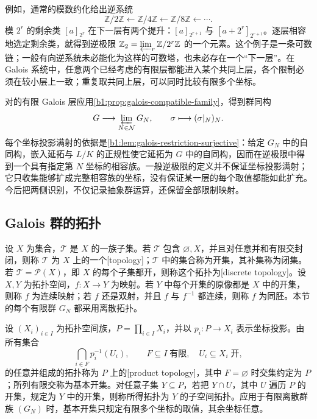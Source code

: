 \ProseParagraphBreak
例如，通常的模数约化给出逆系统
\[
	\mathbb Z/2\mathbb Z\longleftarrow \mathbb Z/4\mathbb Z\longleftarrow \mathbb Z/8\mathbb Z\longleftarrow\cdots.
\]
模 \(2^r\) 的剩余类 \([a]_{2^r}\) 在下一层有两个提升：\([a]_{2^{r+1}}\) 与 \([a+2^r]_{2^{r+1}}\)。逐层相容地选定剩余类，就得到逆极限 \(\mathbb Z_2=\varprojlim_r\mathbb Z/2^r\mathbb Z\) 的一个元素。这个例子是一条可数链；一般有向逆系统未必能化为这样的可数塔，也未必存在一个“下一层”。在 Galois 系统中，任意两个已经考虑的有限层都能进入某个共同上层，各个限制必须在较小层上一致；重复取共同上层，可以同时比较有限多个坐标。

\ProseParagraphBreak
对的有限 Galois 层应用\cref{b1:prop:galois-compatible-family}，得到群同构
\begin{equation}\label{b1:eq:galois-inverse-limit}
	G\longrightarrow\varprojlim_{N\in\mathcal N}G_N, \qquad\sigma\longmapsto(\sigma|_N)_N.
\end{equation}
每个坐标投影满射的依据是\cref{b1:lem:galois-restriction-surjective}：给定 \(G_N\) 中的自同构，嵌入延拓与 \(L/K\) 的正规性使它延拓为 \(G\) 中的自同构，因而在逆极限中得到一个具有指定第 \(N\) 坐标的相容族。一般逆极限的定义并不保证坐标投影满射；它只收集能够扩成完整相容族的坐标，没有保证某一层的每个取值都能如此扩充。今后把两侧识别，不仅记录抽象群运算，还保留全部限制映射。

\subsection{Galois 群的拓扑}
\label{b1:subsec:2202:02}
设 \(X\) 为集合，\(\mathcal T\) 是 \(X\) 的一族子集。若 \(\mathcal T\) 包含 \(\varnothing,X\)，并且对任意并和有限交封闭，则称 \(\mathcal T\) 为 \(X\) 上的一个[topology]；\(\mathcal T\) 中的集合称为开集，其补集称为闭集。若 \(\mathcal T=\mathcal P(X)\)，即 \(X\) 的每个子集都开，则称这个拓扑为[discrete topology]。设 \(X,Y\) 为拓扑空间，\(f:X\rightarrow Y\) 为映射。若 \(Y\) 中每个开集的原像都是 \(X\) 中的开集，则称 \(f\) 为连续映射；若 \(f\) 还是双射，并且 \(f\) 与 \(f^{-1}\) 都连续，则称 \(f\) 为同胚。本节的每个有限群 \(G_N\) 都采用离散拓扑。

\ProseParagraphBreak
设 \((X_i)_{i\in I}\) 为拓扑空间族，\(P=\prod_{i\in I}X_i\)，并以 \(p_i:P\rightarrow X_i\) 表示坐标投影。由所有集合
\[
	\bigcap_{i\in F}p_i^{-1}(U_i), \qquad F\subseteq I\;\text{有限},\quad U_i\subseteq X_i\;\text{开},
\]
的任意并组成的拓扑称为 \(P\) 上的[product topology]，其中 \(F=\varnothing\) 时交集约定为 \(P\)；所列有限交称为基本开集。对任意子集 \(Y\subseteq P\)，若把 \(Y\cap U\)，其中 \(U\) 遍历 \(P\) 的开集，规定为 \(Y\) 中的开集，则称所得拓扑为 \(Y\) 的子空间拓扑。应用于有限离散群族 \((G_N)\) 时，基本开集只规定有限多个坐标的取值，其余坐标任意。

